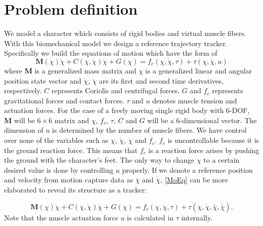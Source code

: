 \documentclass[a4paper,10pt]{article}
\begin{document}

\pagebreak

\section{Problem definition}

We model a character which consists of rigid bodies and virtual muscle fibers.
With this biomechanical model we design a reference trajectory tracker.
Specifically we build the equations of motion which have the
form of
\begin{equation}\label{MoEq}
\mathbf{M}(\chi)\ddot\chi + C(\chi,\dot\chi )\dot\chi + G(\chi ) = f_c(\chi, \dot\chi, \tau ) + \tau (\chi, \dot\chi, u)
\end{equation}
where $\mathbf{M}$ is a generalized mass matrix and $\chi$ is a generalized
linear and angular position
state vector and $\dot\chi$, $\ddot\chi$ are its first and second time derivatives,
respectively. $C$ represents Coriolis and centrifugal forces.
$G$ and $f_c$ represents gravitational forces and contact forces.
$\tau$ and $u$ denotes muscle tension and actuation forces.
For the case of a freely moving single
rigid body with 6-DOF, $\mathbf{M}$ will be $6\times 6$ matrix and $\chi$,
$f_c$, $\tau$, $C$ and $G$ will be a 6-dimensional vector. The dimension of $u$ is
determined by the number of muscle fibers. We have control
over none of the variables such as $\chi$, $\dot\chi$, $\ddot\chi$ and $f_c$.
$f_c$ is uncontrollable because it is the ground reaction force. This means that
$f_c$ is a reaction force arises by pushing the ground with the character's feet.
The only way to change $\chi$ to a certain desired value is done by controlling $u$
properly. If we denote a reference position and velocity from motion capture data
as $\bar\chi$ and $\dot{\bar\chi}$, \eqref{MoEq} can be more elaborated
to reveal its structure as a tracker:

\begin{equation}\label{MoEq2}
\mathbf{M}(\chi)\ddot\chi + C(\chi,\dot\chi )\dot\chi + G(\chi ) = f_c(\chi, \dot\chi, \tau ) + \tau (\chi, \dot\chi, \bar\chi, \dot{\bar\chi}).
\end{equation}
Note that the muscle actuation force $u$ is calculated in $\tau$ internally. 
\end{document}
